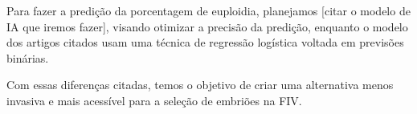 Para fazer a predição da porcentagem de euploidia, planejamos [citar o modelo de IA que iremos fazer], visando otimizar a precisão da predição, enquanto o modelo dos artigos citados usam uma técnica de regressão logística voltada em previsões binárias.

Com essas diferenças citadas, temos o objetivo de criar uma alternativa menos invasiva e mais acessível para a seleção de embriões na FIV.
